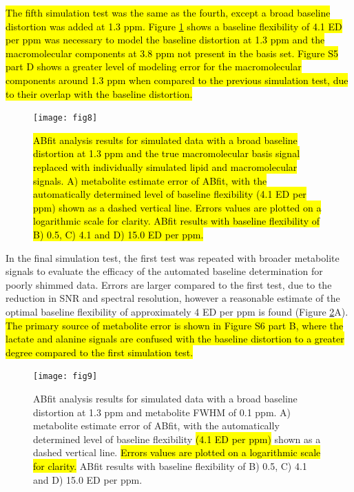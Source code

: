 \documentclass[num-refs]{wiley-article}
\newcommand{\revone}[2]{\hl{#1}\marginnote{\hl{#2}}}
\newcommand{\revonenm}[1]{\hl{#1}} %
\begin{document}
\revone{The fifth simulation test was the same as the fourth, except a broad baseline distortion was added at 1.3 ppm. Figure \ref{sim_lip_mm_basis_broad_bl} shows a baseline flexibility of 4.1 ED per ppm was necessary to model the baseline distortion at 1.3 ppm and the macromolecular components at 3.8 ppm not present in the basis set. Figure S5 part D shows a greater level of modeling error for the macromolecular components around 1.3 ppm when compared to the previous simulation test, due to their overlap with the baseline distortion.}{R1.2\linebreak R1.3}

\begin{figure}
  \begin{center}
    \texttt{[image: fig8]}
    \caption{\revonenm{ABfit analysis results for simulated data with a broad baseline distortion at 1.3 ppm and the true macromolecular basis signal replaced with individually simulated lipid and macromolecular signals. A) metabolite estimate error of ABfit, with the automatically determined level of baseline flexibility (4.1 ED per ppm) shown as a dashed vertical line. Errors values are plotted on a logarithmic scale for clarity. ABfit results with baseline flexibility of B) 0.5, C) 4.1 and D) 15.0 ED per ppm.}}
    \label{sim_lip_mm_basis_broad_bl}
  \end{center}
\end{figure}

In the final simulation test, the first test was repeated with broader metabolite signals to evaluate the efficacy of the automated baseline determination for poorly shimmed data. Errors are larger compared to the first test, due to the reduction in SNR and spectral resolution, however a reasonable estimate of the optimal baseline flexibility of approximately 4 ED per ppm is found (Figure \ref{broad_bl_bad_shim}A). \revone{The primary source of metabolite error is shown in Figure S6 part B, where the lactate and alanine signals are confused with the baseline distortion to a greater degree compared to the first simulation test.}{R1.2}

\begin{figure}
  \begin{center}
    \texttt{[image: fig9]}
    \caption{ABfit analysis results for simulated data with a broad baseline distortion at 1.3 ppm and metabolite FWHM of 0.1 ppm. A) metabolite estimate error of ABfit, with the automatically determined level of baseline flexibility \revonenm{(4.1 ED per ppm)} shown as a dashed vertical line. \revonenm{Errors values are plotted on a logarithmic scale for clarity.} ABfit results with baseline flexibility of B) 0.5, C) 4.1 and D) 15.0 ED per ppm.}
    \label{broad_bl_bad_shim}
  \end{center}
\end{figure}
\end{document}
